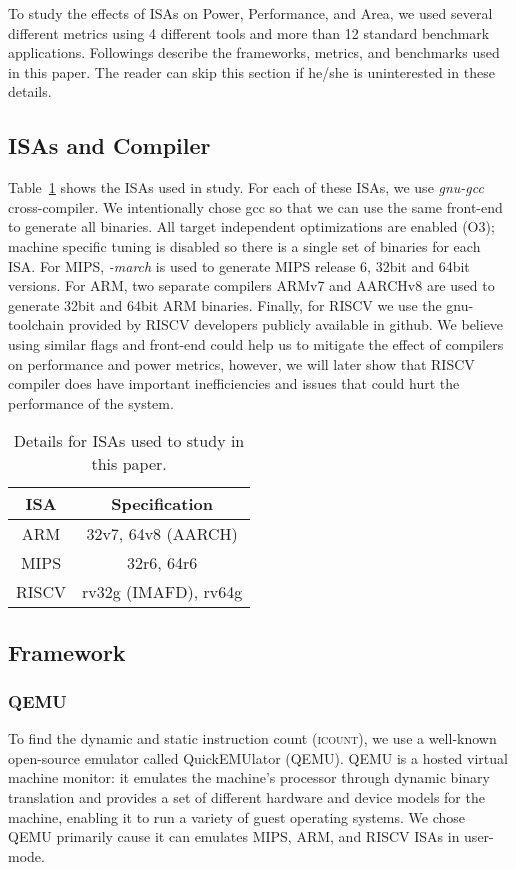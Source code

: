 
\newcommand{\icount}{\textsc{icount}\xspace}

To study the effects of ISAs on Power, Performance, and Area, we used several different metrics using 4 different tools and more than 12 standard benchmark applications. Followings describe the frameworks, metrics, and benchmarks used in this paper. The reader can skip this section if he/she is uninterested in these details. 

\subsection{ISAs and Compiler}
Table~\ref{t:isa} shows the ISAs used in study. For each of these ISAs, we use \textit{gnu-gcc} cross-compiler. We intentionally chose gcc so
that we can use the same front-end to generate all binaries. All
target independent optimizations are enabled (O3); machine specific
tuning is disabled so there is a single set of binaries for each ISA. For MIPS, \textit{-march} is used to generate MIPS release 6, 32bit and 64bit versions. For ARM, two separate compilers ARMv7 and AARCHv8 are used to generate 32bit and 64bit ARM binaries. Finally, for RISCV we use the gnu-toolchain provided by RISCV developers publicly available in github. We believe using similar flags and front-end could help us to mitigate the effect of compilers on performance and power metrics, however, we will later show that RISCV compiler does have important inefficiencies and issues that could hurt the performance of the system. 

\begin{table}[h]
\centering
\caption{Details for ISAs used to study in this paper.}
\begin{tabular}{|c|c|}
\hline
\small ISA & \small Specification \\
\hline
\small ARM & \small  32v7, 64v8 (AARCH) \\
\hline
\small MIPS & \small 32r6, 64r6 \\
\hline
\small RISCV &\small  rv32g (IMAFD), rv64g \\
\hline
\end{tabular}
\label{t:isa}
\end{table}

\subsection{Framework} 
\subsubsection{QEMU}
To find the dynamic and static instruction count (\icount), we use a well-known open-source emulator called QuickEMUlator (QEMU). QEMU is a hosted virtual machine monitor: it emulates the machine's processor through dynamic binary translation and provides a set of different hardware and device models for the machine, enabling it to run a variety of guest operating systems. We chose QEMU primarily cause it can emulates MIPS, ARM, and RISCV ISAs in user-mode. 



